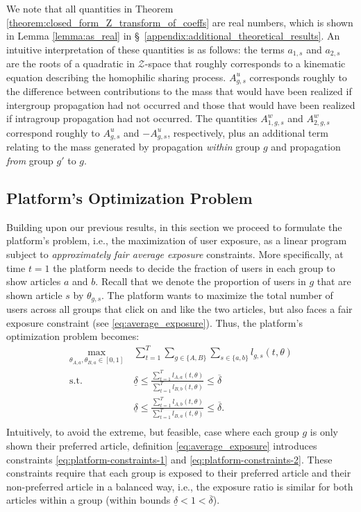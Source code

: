 \documentclass[letterpaper]{article} %
\begin{document}
We note that all quantities in Theorem \ref{theorem:closed_form_Z_transform_of_coeffs} are real numbers, which is shown in Lemma \ref{lemma:as_real} in \S~\ref{appendix:additional_theoretical_results}.
An intuitive interpretation of these quantities is as follows: the terms $a_{1,s}$ and $a_{2,s}$ are the roots of a quadratic in $\mathcal{Z}$-space that roughly corresponds to a kinematic equation describing the homophilic sharing process.
$A^u_{g,s}$ corresponds roughly to the difference between contributions to the mass that would have been realized if intergroup propagation had not occurred and those that would have been realized if intragroup propagation had not occurred.
The quantities $A^w_{1,g,s}$ and $A^w_{2,g,s}$ correspond roughly to $A^u_{g,s}$ and $-A^u_{g,s}$, respectively, plus an additional term relating to the mass generated by propagation \emph{within} group $g$ and propagation \emph{from} group $g'$ to $g$.


\subsection{Platform's Optimization Problem}\label{sec:platform_optimization_problem}
Building upon our previous results, in this section we proceed to formulate the  platform's problem, i.e., the maximization of user exposure, as a linear program subject to \emph{approximately fair average exposure} constraints.
More specifically, at time $t=1$ the platform needs to decide the fraction of users in each group to show articles $a$ and $b$.
Recall that we denote the proportion of users in $g$ that are shown article $s$ by $\theta_{g,s}$.
The platform wants to maximize the total number of users across all groups that click on and like the two articles, but also faces
a fair exposure constraint (see \eqref{eq:average_exposure}).
Thus, the platform's optimization problem  becomes:
\footnotesize
\begin{align*}
    \tag{P}
    \max_{\theta_{A,a}, \theta_{B,a}\in [0,1]} \ &\sum_{t = 1}^T \sum_{g\in \{A,B\}}\sum_{s\in \{a,b\}} l_{g,s}(t,\theta) \label{eq:platform-objective}\\
    \tag{C1}
    \text{s.t.} \ &
    \underline{\delta} \leq \frac{\sum_{t=1}^T l_{A,a}(t,\theta)}{\sum_{t=1}^T l_{B,b}(t,\theta)}  \leq \overline{\delta}
    \label{eq:platform-constraints-1}  \\
    \tag{C2}
    &\underline{\delta}\leq \frac{\sum_{t=1}^T l_{A,b}(t,\theta)}{\sum_{t=1}^T l_{B,a}(t,\theta)}  \leq \overline{\delta}.
    \label{eq:platform-constraints-2} \\
\end{align*}
\normalsize
Intuitively, to avoid the extreme, but feasible, case where each group $g$ is only shown their preferred article, definition \eqref{eq:average_exposure} introduces constraints \eqref{eq:platform-constraints-1} and \eqref{eq:platform-constraints-2}.
These constraints require that each group is exposed to their preferred article and their non-preferred article in a balanced way, i.e., the exposure ratio is similar for both articles within a group (within bounds $\underline{\delta} <1 < \overline{\delta}$).
\end{document}
